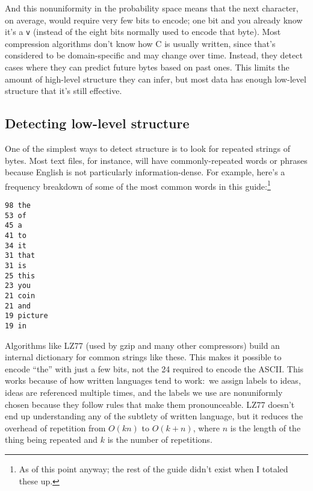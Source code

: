 \documentclass{article}
\begin{document}
  And this nonuniformity in the probability space means that the next
  character, on average, would require very few bits to encode; one bit and you
  already know it's a {\tt v} (instead of the eight bits normally used to
  encode that byte). Most compression algorithms don't know how C is usually
  written, since that's considered to be domain-specific and may change over
  time. Instead, they detect cases where they can predict future bytes based on
  past ones. This limits the amount of high-level structure they can infer, but
  most data has enough low-level structure that it's still effective.

\subsection{Detecting low-level structure}\label{sec:low-level-structure}
    One of the simplest ways to detect structure is to look for repeated
    strings of bytes. Most text files, for instance, will have
    commonly-repeated words or phrases because English is not particularly
    information-dense. For example, here's a frequency breakdown of some of the
    most common words in this guide:\footnote{As of this point anyway; the
    rest of the guide didn't exist when I totaled these up.}

\begin{verbatim}
98 the
53 of
45 a
41 to
34 it
31 that
31 is
25 this
23 you
21 coin
21 and
19 picture
19 in
\end{verbatim}

    Algorithms like LZ77 (used by gzip and many other compressors) build an
    internal dictionary for common strings like these. This makes it possible
    to encode ``the'' with just a few bits, not the 24 required to encode the
    ASCII. This works because of how written languages tend to work:~we assign
    labels to ideas, ideas are referenced multiple times, and the labels we use
    are nonuniformly chosen because they follow rules that make them
    pronounceable. LZ77 doesn't end up understanding any of the subtlety of
    written language, but it reduces the overhead of repetition from $O(kn)$ to
    $O(k + n)$, where $n$ is the length of the thing being repeated and $k$ is
    the number of repetitions.
\end{document}
